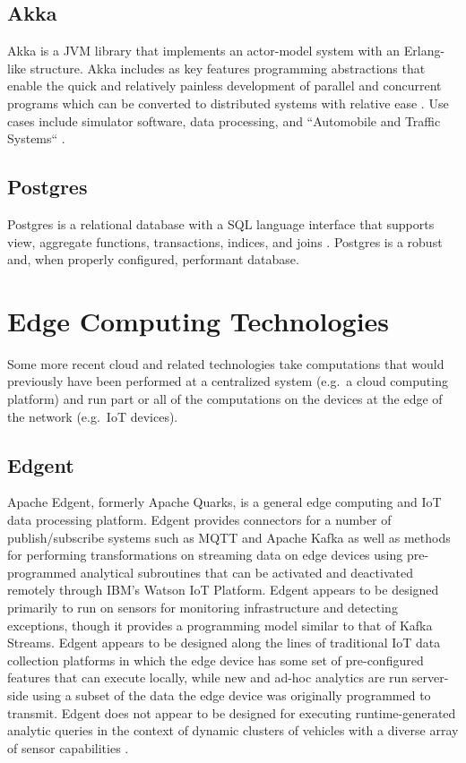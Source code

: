 \documentclass{thesis}
\begin{document}
    \subsection{Akka}
        Akka is a JVM library that implements an actor-model system with an Erlang-like structure.
        Akka includes as key features programming abstractions that enable the quick and relatively
        painless development of parallel and concurrent programs which can be converted to distributed
        systems with relative ease \cite{akka}. Use cases include simulator software, data processing,
        and ``Automobile and Traffic Systems`` \cite{akka}.
    \subsection{Postgres}
        Postgres is a relational database with a SQL language interface that supports view, aggregate
        functions, transactions, indices, and joins \cite{postgres}. Postgres is a robust and, when
        properly configured, performant database.
    \section{Edge Computing Technologies}
        Some more recent cloud and related technologies take computations that would previously have
        been performed at a centralized system (e.g.\ a cloud computing platform) and run part or all
        of the computations on the devices at the edge of the network (e.g.\ IoT devices).
    \subsection{Edgent}
        Apache Edgent, formerly Apache Quarks, is a general edge computing and IoT data processing
        platform. Edgent provides connectors for a number of publish/subscribe systems such as 
        MQTT and Apache Kafka as well as methods for performing transformations on streaming
        data on edge devices using pre-programmed analytical subroutines that can be activated and
        deactivated remotely through IBM's Watson IoT Platform. Edgent appears to be designed
        primarily to run on sensors for monitoring infrastructure and detecting exceptions, though
        it provides a programming model similar to that of Kafka Streams. Edgent appears to be 
        designed along the lines of traditional IoT data collection platforms in which the edge
        device has some set of pre-configured features that can execute locally, while new and
        ad-hoc analytics are run server-side using a subset of the data the edge device
        was originally programmed to transmit. Edgent does not appear to be designed for executing
        runtime-generated analytic queries in the context of dynamic clusters of vehicles with a diverse
        array of sensor capabilities \cite{edgent}.
\end{document}
